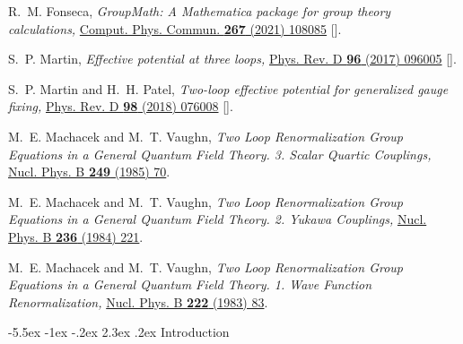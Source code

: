 \documentclass[11pt]{article}
\makeatletter
\renewcommand\section{\@startsection{section}{1}{\z@}%
  {-5.5ex \@plus -1ex \@minus -.2ex}%
  {2.3ex \@plus.2ex}%
  {\normalfont\large\bfseries}}
\makeatother
\begin{document}
{\small
%
%
%
\begin{thebibliography}{999}
R.~M. Fonseca, {\em{GroupMath: A Mathematica package for group theory
calculations},} \href{http://dx.doi.org/10.1016/j.cpc.2021.108085}{Comput.
Phys. Commun. {\bf 267} (2021) 108085}
[\href{http://arxiv.org/abs/2011.01764}{{}}].


S.~P. Martin, {\em{Effective potential at three loops},}
\href{http://dx.doi.org/10.1103/PhysRevD.96.096005}{Phys. Rev. D {\bf 96}
(2017) 096005} [\href{http://arxiv.org/abs/1709.02397}{{}}].

S.~P. Martin and H.~H. Patel, {\em{Two-loop effective potential for generalized
gauge fixing},} \href{http://dx.doi.org/10.1103/PhysRevD.98.076008}{Phys.
Rev. D {\bf 98} (2018) 076008}
[\href{http://arxiv.org/abs/1808.07615}{{}}].


M.~E. Machacek and M.~T. Vaughn, {\em{Two Loop Renormalization Group Equations
in a General Quantum Field Theory. 3. Scalar Quartic Couplings},}
\href{http://dx.doi.org/10.1016/0550-3213(85)90040-9}{Nucl. Phys. B {\bf 249}
(1985) 70}.


M.~E. Machacek and M.~T. Vaughn, {\em{Two Loop Renormalization Group Equations
in a General Quantum Field Theory. 2. Yukawa Couplings},}
\href{http://dx.doi.org/10.1016/0550-3213(84)90533-9}{Nucl. Phys. B {\bf 236}
(1984) 221}.


M.~E. Machacek and M.~T. Vaughn, {\em{Two Loop Renormalization Group Equations
in a General Quantum Field Theory. 1. Wave Function Renormalization},}
\href{http://dx.doi.org/10.1016/0550-3213(83)90610-7}{Nucl. Phys. B {\bf 222}
(1983) 83}.
\end{thebibliography}
}




%
\section{Introduction}
\label{sec:intro}
\end{document}
